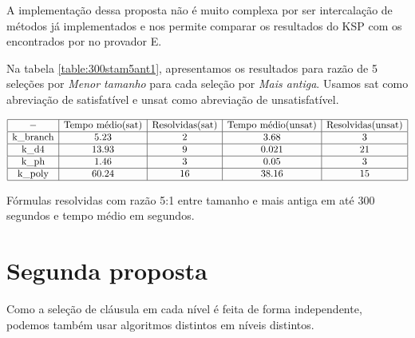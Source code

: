 A implementação dessa proposta não é muito complexa por ser intercalação de métodos já implementados e nos permite comparar os resultados do KSP com os encontrados por \cite{stephan} no provador E.



Na tabela \ref{table:300stam5ant1}, apresentamos os resultados para razão de 5 seleções por \textit{Menor tamanho} para cada seleção por \textit{Mais antiga}. Usamos sat como abreviação de satisfatível e unsat como abreviação de unsatisfatível.
\begin{table*}[t]
	\[
\begin{array}{|c|c|c|c|c|}
	\hline - & \textnormal{Tempo médio(sat)} & \textnormal{Resolvidas(sat)} & \textnormal{Tempo médio(unsat)} & \textnormal{Resolvidas(unsat)} \\
	
	\hline \textnormal{k\_branch} & 5.23 & 2 & 3.68 & 3 \\
	\hline \textnormal{k\_d4} & 13.93 & 9 & 0.021 & 21 \\
	\hline \textnormal{k\_ph} & 1.46 & 3 & 0.05 & 3 \\
	\hline \textnormal{k\_poly} & 60.24 & 16 & 38.16 & 15 \\
	
	\hline
	
\end{array}
	\]
\caption{Fórmulas resolvidas com razão 5:1 entre tamanho e mais antiga em até 300 segundos e tempo médio em segundos.}
\label{table:300stam5ant1}
\end{table*} %

\section{Segunda proposta}
Como a seleção de cláusula em cada nível é feita de forma independente, podemos também usar algoritmos distintos em níveis distintos.

